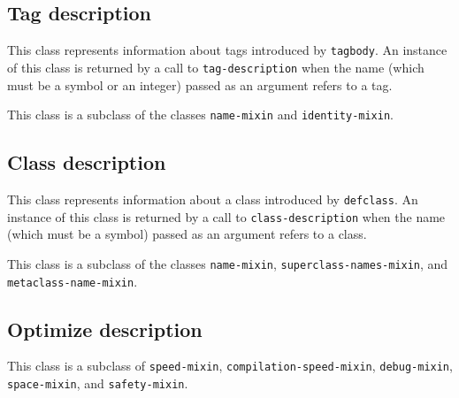 \subsection{Tag description}
\label{sec-instantiable-classes-tag-desciption}

{\footnotesize
{}
}

This class represents information about tags introduced by
\texttt{tagbody}.  An instance of this class is returned by a call to
\texttt{tag-description} when the name (which must be a symbol or an integer)
passed as an argument refers to a tag.

This class is a subclass of the classes \texttt{name-mixin} and
\texttt{identity-mixin}.

\subsection{Class description}
\label{sec-instantiable-classes-class-desciption}

{\footnotesize
{}
}

This class represents information about a class introduced by
\texttt{defclass}.  An instance of this class is returned by a call to
\texttt{class-description} when the name (which must be a symbol)
passed as an argument refers to a class.

This class is a subclass of the classes \texttt{name-mixin},
\texttt{superclass-names-mixin},  and
\texttt{metaclass-name-mixin}.

\subsection{Optimize description}
\label{sec-instantiable-classes-optimize-desciption}

{\footnotesize
{}
}

This class is a subclass of \texttt{speed-mixin},
\texttt{compilation-speed-mixin}, \texttt{debug-mixin},
\texttt{space-mixin}, and \texttt{safety-mixin}.
